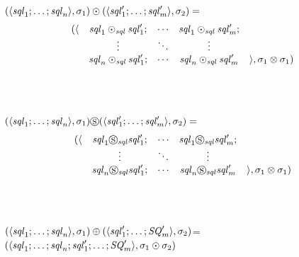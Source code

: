 \documentclass[numbers]{sigplanconf}
\begin{document}
\begin{definition}
  \\
  \\\ConcatDNFLens{} \OfType{}
  \ArrowTypeOf{\DNFLensType{}}{\ArrowTypeOf{\DNFLensType{}}{\DNFLensType{}}}\\
  $(\langle\mathit{sql}_1;\ldots;\mathit{sql}_n\rangle,\sigma_1)\odot(\langle\mathit{sql}_1';\ldots;\mathit{sql}_m'\rangle,\sigma_2)=$
  \[
    \begin{array}{rcccl}
      (\langle & \mathit{sql}_1\odot_{\mathit{sql}}\mathit{sql}_1'; & \cdots & \mathit{sql}_1\odot_{\mathit{sql}}\mathit{sql}_m'; \\
                    & \vdots & \ddots & \vdots \\
                    & \mathit{sql}_n\odot_{\mathit{sql}}\mathit{sql}_1'; & \cdots & \mathit{sql}_n\odot_{\mathit{sql}}\mathit{sql}_m' & \rangle,\sigma_1\otimes\sigma_1)
    \end{array}
  \]
  \\
  \\\SwapDNFLens{} \OfType{}
  \ArrowTypeOf{\DNFLensType{}}{\ArrowTypeOf{\DNFLensType{}}{\DNFLensType{}}}\\
  $(\langle\mathit{sql}_1;\ldots;\mathit{sql}_n\rangle,\sigma_1)\circledS(\langle\mathit{sql}_1';\ldots;\mathit{sql}_m'\rangle,\sigma_2)=$
  \[
    \begin{array}{rcccl}
      (\langle & \mathit{sql}_1\circledS_{\mathit{sql}}\mathit{sql}_1'; & \cdots & \mathit{sql}_1\circledS_{\mathit{sql}}\mathit{sql}_m'; \\
                    & \vdots & \ddots & \vdots \\
                    & \mathit{sql}_n\circledS_{\mathit{sql}}\mathit{sql}_1'; & \cdots & \mathit{sql}_n\circledS_{\mathit{sql}}\mathit{sql}_m' & \rangle,\sigma_1\otimes\sigma_1)
    \end{array}
  \]
  \\
  \\\OrDNFLens{} \OfType{}
  \ArrowTypeOf{\DNFLensType{}}{\ArrowTypeOf{\DNFLensType{}}{\DNFLensType{}}
  }\\
  $(\langle\mathit{sql}_1;\ldots;\mathit{sql}_n\rangle,\sigma_1)\oplus({\langle\mathit{sql}_1';\ldots;\mathit{SQ}_m'\rangle,\sigma_2)}$=\\
  \hspace*{2ex}$(\langle\mathit{sql}_1;\ldots;\mathit{sql}_n;
    \mathit{sql}_1';\ldots;\mathit{SQ}_m'\rangle,\sigma_1\odot\sigma_2)$\\
\end{definition}
\end{document}
